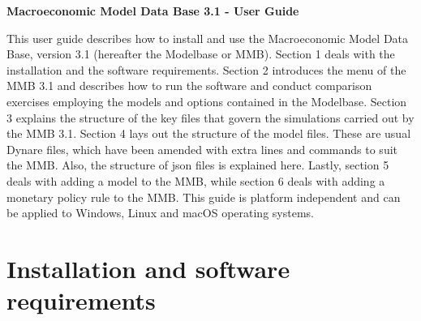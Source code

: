 \documentclass[11pt,a4paper]{article}
\begin{document}


\begin{center}
{\Large \textbf{Macroeconomic Model Data Base 3.1 - User Guide } }
\par\end{center}


\vspace{1.5cm}


\noindent This user guide describes how to install and use the Macroeconomic Model Data Base, version 3.1 (hereafter the Modelbase or MMB). Section 1 deals with the installation and the software requirements.
Section 2 introduces the menu of the MMB 3.1 and describes how to run the software and conduct comparison exercises employing the models and options contained in the Modelbase.
Section 3 explains the structure of the key files that govern the simulations carried out by the MMB 3.1. 
Section 4 lays out the structure of the model files. These are usual Dynare files, which have been amended with extra lines and commands to suit the MMB. Also, the structure of json files is explained here.
Lastly, section 5 deals with adding a model to the MMB, while section 6 deals with adding a monetary policy rule to the MMB.
This guide is platform independent and can be applied to Windows, Linux and macOS operating systems.


%
%
%
\section{Installation and software requirements}\label{sec:installation}
\vspace{0.5cm}

\end{document}
